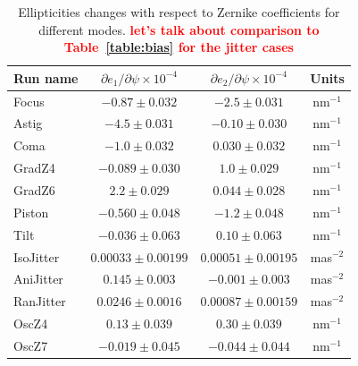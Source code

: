\documentclass[aps,prd, amsmath,amssymb,superscriptaddress,showkeys,nofootinbib,reprint,preprintnumbers]{revtex4-1}
\newcommand{\verify}[1]{\textcolor{red}{\textbf{{#1}}}}
\begin{document}
\begin{table}
\label{table:partials}
\caption{Ellipticities changes with respect to Zernike coefficients for different modes. \verify{let's talk about comparison to Table~\ref{table:bias} for the jitter cases}}\label{dpsi}
\begin{center}
\begin{tabular}{ lccc }
\hline
\hline
Run name & $\partial e_1/\partial\psi \times 10^{-4}$ & $\partial e_2/\partial\psi \times 10^{-4}$ & Units \\
\hline
Focus           & $-0.87  \pm 0.032$   & $-2.5  \pm 0.031$ & nm$^{-1}$ \\
Astig           & $-4.5   \pm 0.031$   & $-0.10 \pm 0.030$  & nm$^{-1}$ \\
Coma            & $-1.0   \pm 0.032$   & $0.030 \pm 0.032$  & nm$^{-1}$ \\
GradZ4          & $-0.089 \pm 0.030$   & $1.0   \pm 0.029$  & nm$^{-1}$ \\
GradZ6          & $2.2    \pm 0.029$   & $0.044 \pm 0.028$  & nm$^{-1}$ \\
Piston 		    & $-0.560  \pm 0.048$  & $-1.2  \pm 0.048$  & nm$^{-1}$ \\
Tilt 			& $-0.036 \pm 0.063$   & $0.10  \pm 0.063$  & nm$^{-1}$ \\ \hline
IsoJitter 		& $  0.00033 \pm 0.00199$     & $0.00051  \pm 0.00195$ & mas$^{-2}$ \\
AniJitter 		& $0.145   \pm 0.003$  & $-0.001 \pm 0.003$ & mas$^{-2}$ \\
RanJitter 	    & $0.0246  \pm 0.0016$  & $0.00087  \pm 0.00159$ & mas$^{-2}$ \\ \hline
OscZ4 		    & $0.13   \pm 0.039$   & $0.30  \pm 0.039$  & nm$^{-1}$ \\
OscZ7 		    & $-0.019 \pm 0.045$   & $-0.044\pm 0.044$   & nm$^{-1}$ \\
\hline
\hline
\end{tabular}
\end{center}
\end{table}
\end{document}
